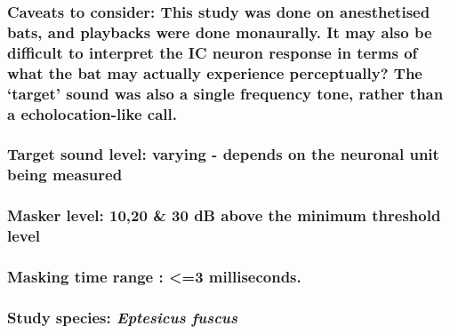 \documentclass[11pt]{article}
\begin{document}
\hypertarget{caveats-to-consider-this-study-was-done-on-anesthetised-bats-and-playbacks-were-done-monaurally.-it-may-also-be-difficult-to-interpret-the-ic-neuron-response-in-terms-of-what-the-bat-may-actually-experience-perceptually-the-target-sound-was-also-a-single-frequency-tone-rather-than-a-echolocation-like-call.}{%
\subsubsection{Caveats to consider: This study was done on anesthetised
bats, and playbacks were done monaurally. It may also be difficult to
interpret the IC neuron response in terms of what the bat may actually
experience perceptually? The `target' sound was also a single frequency
tone, rather than a echolocation-like
call.}\label{caveats-to-consider-this-study-was-done-on-anesthetised-bats-and-playbacks-were-done-monaurally.-it-may-also-be-difficult-to-interpret-the-ic-neuron-response-in-terms-of-what-the-bat-may-actually-experience-perceptually-the-target-sound-was-also-a-single-frequency-tone-rather-than-a-echolocation-like-call.}}

\hypertarget{target-sound-level-varying---depends-on-the-neuronal-unit-being-measured}{%
\subsubsection{Target sound level: varying - depends on the neuronal
unit being
measured}\label{target-sound-level-varying---depends-on-the-neuronal-unit-being-measured}}

\hypertarget{masker-level-1020-30-db-above-the-minimum-threshold-level}{%
\subsubsection{Masker level: 10,20 \& 30 dB above the minimum threshold
level}\label{masker-level-1020-30-db-above-the-minimum-threshold-level}}

\hypertarget{masking-time-range-3-milliseconds.}{%
\subsubsection{Masking time range : \textless{}=3
milliseconds.}\label{masking-time-range-3-milliseconds.}}

\hypertarget{study-species-eptesicus-fuscus-1}{%
\subsubsection{\texorpdfstring{Study species: \emph{Eptesicus
fuscus}}{Study species: Eptesicus fuscus}}\label{study-species-eptesicus-fuscus-1}}
\end{document}

